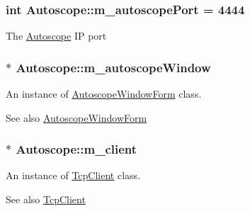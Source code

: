\subsubsection[{\texorpdfstring{m\+\_\+autoscope\+Port}{m_autoscopePort}}]{\setlength{\rightskip}{0pt plus 5cm}int Autoscope\+::m\+\_\+autoscope\+Port = 4444\hspace{0.3cm}{\ttfamily [private]}}\hypertarget{class_autoscope_abb67968cc6c6678995512aa1a05ad0e1}{}\label{class_autoscope_abb67968cc6c6678995512aa1a05ad0e1}
The \hyperlink{class_autoscope}{Autoscope} IP port 
\subsubsection[{\texorpdfstring{m\+\_\+autoscope\+Window}{m_autoscopeWindow}}]{$\ast$ Autoscope\+::m\+\_\+autoscope\+Window\hspace{0.3cm}{\ttfamily [private]}}\hypertarget{class_autoscope_a33104164061c784c65c1f94bfde26423}{}\label{class_autoscope_a33104164061c784c65c1f94bfde26423}


An instance of \hyperlink{class_autoscope_window_form}{Autoscope\+Window\+Form} class. 

\begin{DoxySeeAlso}{See also}
\hyperlink{class_autoscope_window_form}{Autoscope\+Window\+Form} 
\end{DoxySeeAlso}
\subsubsection[{\texorpdfstring{m\+\_\+client}{m_client}}]{$\ast$ Autoscope\+::m\+\_\+client\hspace{0.3cm}{\ttfamily [private]}}\hypertarget{class_autoscope_af6e7a8d7cf7014e9b0f9296e2b7d7fd5}{}\label{class_autoscope_af6e7a8d7cf7014e9b0f9296e2b7d7fd5}


An instance of \hyperlink{class_tcp_client}{Tcp\+Client} class. 

\begin{DoxySeeAlso}{See also}
\hyperlink{class_tcp_client}{Tcp\+Client} 
\end{DoxySeeAlso}

